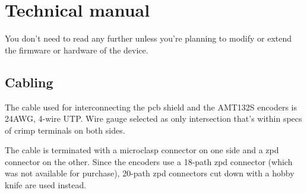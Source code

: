 \documentclass[twoside]{article}
\begin{document}
\newpage{}
\section{Technical manual}

You don't need to read any further unless you're planning to modify or extend the firmware or hardware of the device.

\subsection{Cabling}

The cable used for interconnecting the pcb shield and the AMT132S encoders is 24AWG, 4-wire UTP. Wire gauge selected as only intersection that's within specs of crimp terminals on both sides.

The cable is terminated with a microclasp connector on one side and a zpd connector on the other. Since the encoders use a 18-path zpd connector (which was not available for purchase), 20-path zpd connectors cut down with a hobby knife are used instead.
\end{document}
